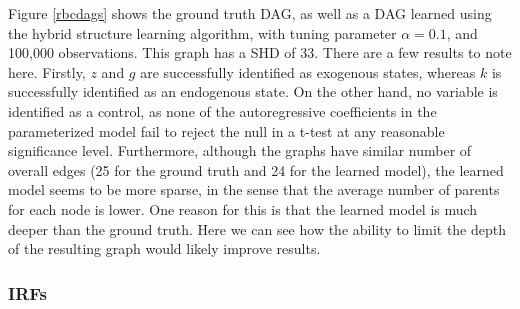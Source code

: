 \documentclass{article}
\begin{document}
Figure \ref{rbcdags} shows the ground truth DAG, as well as a DAG learned using the hybrid structure learning algorithm, with tuning parameter $\alpha = 0.1$, and 100,000 observations. This graph has a SHD of 33. There are a few results to note here. Firstly, $z$ and $g$ are successfully identified as exogenous states, whereas $k$ is successfully identified as an endogenous state. On the other hand, no variable is identified as a control, as none of the autoregressive coefficients in the parameterized model fail to reject the null in a t-test at any reasonable significance level. Furthermore, although the graphs have similar number of overall edges (25 for the ground truth and 24 for the learned model), the learned model seems to be more sparse, in the sense that the average number of parents for each node is lower. One reason for this is that the learned model is much deeper than the ground truth. Here we can see how the ability to limit the depth of the resulting graph would likely improve results. 

\subsubsection{IRFs}
\end{document}
